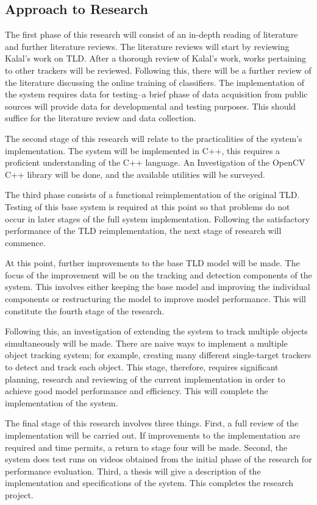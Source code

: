 \subsection{Approach to Research}
  The first phase of this research will consist of an in-depth reading of literature and further literature reviews.
  The literature reviews will start by reviewing Kalal's work on TLD.
  After a thorough review of Kalal's work, works pertaining to other trackers will be reviewed.
  Following this, there will be a further review of the literature discussing the online training of classifiers.
  The implementation of the system requires data for testing--a brief phase of data acquisition from public sources will provide data for developmental and testing purposes.
  This should suffice for the literature review and data collection.

  The second stage of this research will relate to the practicalities of the system's implementation.
  The system will be implemented in C++, this requires a proficient understanding of the C++ language.
  An Investigation of the OpenCV C++ library will be done, and the available utilities will be surveyed.

  The third phase consists of a functional reimplementation of the original TLD.
  Testing of this base system is required at this point so that problems do not occur in later stages of the full system implementation.
  Following the satisfactory performance of the TLD reimplementation, the next stage of research will commence.

  At this point, further improvements to the base TLD model will be made.
  The focus of the improvement will be on the tracking and detection components of the system. 
  This involves either keeping the base model and improving the individual components or restructuring the model to improve model performance.
  This will constitute the fourth stage of the research.

  Following this, an investigation of extending the system to track multiple objects simultaneously will be made.
  There are naive ways to implement a multiple object tracking system; for example, creating many different single-target trackers to detect and track each object.
  This stage, therefore, requires significant planning, research and reviewing of the current implementation in order to achieve good model performance and efficiency.
  This will complete the implementation of the system.

  The final stage of this research involves three things.
  First, a full review of the implementation will be carried out.
  If improvements to the implementation are required and time permits, a return to stage four will be made.
  Second, the system does test runs on videos obtained from the initial phase of the research for performance evaluation.
  Third, a thesis will give a description of the implementation and specifications of the system.
  This completes the research project.
